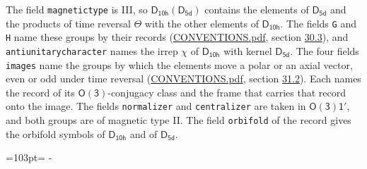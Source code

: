 \documentclass[10pt,a4paper]{article}
\newcommand{\needspace}[1]{\par\penalty-100\begingroup\dimen0=#1\relax\dimen2=\pagegoal
  \advance\dimen2-\pagetotal\ifdim\dimen0>\dimen2\relax\ifdim\dimen2>0pt\vfil\break\fi\fi
  \endgroup}
\numberwithin{equation}{section}
\newcommand{\grp}[1]{\mathsf{#1}}
\begin{document}
The field \texttt{magnetictype} is III, so $\grp{D_{10h}}(\grp{D_{5d}})$ contains the elements of $\grp{D_{5d}}$ and the products of time reversal $\varTheta$ with the other elements of $\grp{D_{10h}}$. The fields \texttt{G} and \texttt{H} name these groups by their records (\href{../../CONVENTIONS.pdf}{CONVENTIONS.pdf}, section \href{../../CONVENTIONS.pdf\#conv.30.3}{30.3}), and \texttt{antiunitarycharacter} names the irrep $\chi$ of $\grp{D_{10h}}$ with kernel $\grp{D_{5d}}$. The four fields \texttt{images} name the groups by which the elements move a polar or an axial vector, even or odd under time reversal (\href{../../CONVENTIONS.pdf}{CONVENTIONS.pdf}, section \href{../../CONVENTIONS.pdf\#conv.31.2}{31.2}). Each names the record of its $\grp{O(3)}$-conjugacy class and the frame that carries that record onto the image. The fields \texttt{normalizer} and \texttt{centralizer} are taken in $\grp{O(3)1'}$, and both groups are of magnetic type II. The field \texttt{orbifold} of the record gives the orbifold symbols of $\grp{D_{10h}}$ and of $\grp{D_{5d}}$.
\needspace{103pt}
\end{document}
